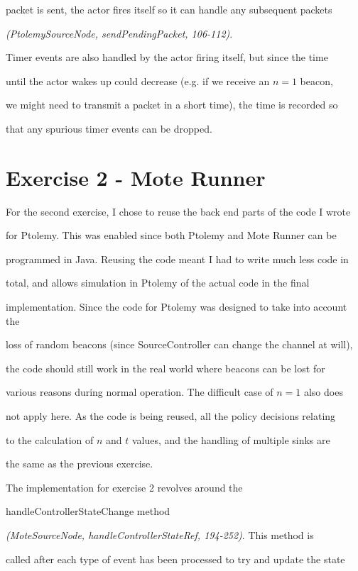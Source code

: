 \documentclass[a4paper,12pt,DIV=calc]{scrartcl}
\newcommand{\coderef}[3]{\emph{(#1, #2, #3)}}
\begin{document}
packet is sent, the actor fires itself so it can handle any subsequent packets

\coderef{PtolemySourceNode}{sendPendingPacket}{106-112}.



Timer events are also handled by the actor firing itself, but since the time

until the actor wakes up could decrease (e.g. if we receive an $n = 1$ beacon,

we might need to transmit a packet in a short time), the time is recorded so

that any spurious timer events can be dropped.



\section{Exercise 2 - Mote Runner}

For the second exercise, I chose to reuse the back end parts of the code I wrote

for Ptolemy. This was enabled since both Ptolemy and Mote Runner can be

programmed in Java. Reusing the code meant I had to write much less code in

total, and allows simulation in Ptolemy of the actual code in the final

implementation. Since the code for Ptolemy was designed to take into account the

loss of random beacons (since SourceController can change the channel at will),

the code should still work in the real world where beacons can be lost for

various reasons during normal operation. The difficult case of $n = 1$ also does

not apply here. As the code is being reused, all the policy decisions relating

to the calculation of $n$ and $t$ values, and the handling of multiple sinks are

the same as the previous exercise.



The implementation for exercise 2 revolves around the

handleControllerStateChange method

\coderef{MoteSourceNode}{handleControllerStateRef}{194-252}. This method is

called after each type of event has been processed to try and update the state
\end{document}
